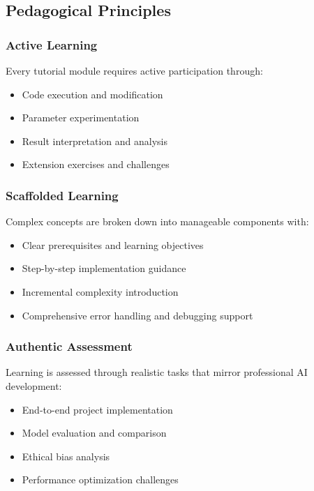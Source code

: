 \subsection{Pedagogical Principles}

\subsubsection{Active Learning}

Every tutorial module requires active participation through:
\begin{itemize}
    \item Code execution and modification
    \item Parameter experimentation
    \item Result interpretation and analysis
    \item Extension exercises and challenges
\end{itemize}

\subsubsection{Scaffolded Learning}

Complex concepts are broken down into manageable components with:
\begin{itemize}
    \item Clear prerequisites and learning objectives
    \item Step-by-step implementation guidance
    \item Incremental complexity introduction
    \item Comprehensive error handling and debugging support
\end{itemize}

\subsubsection{Authentic Assessment}

Learning is assessed through realistic tasks that mirror professional AI development:
\begin{itemize}
    \item End-to-end project implementation
    \item Model evaluation and comparison
    \item Ethical bias analysis
    \item Performance optimization challenges
\end{itemize}

